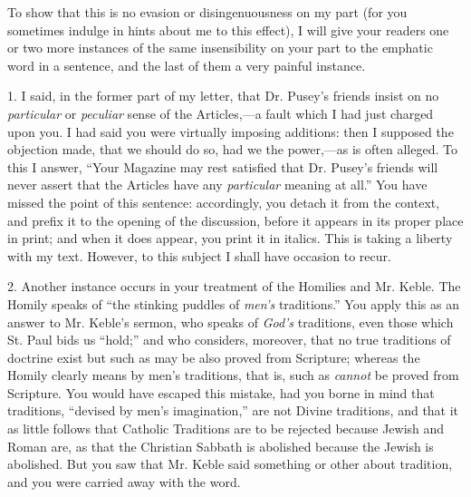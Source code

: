 To show that this is no evasion or
disingenuousness on my part (for you sometimes indulge in hints about
me to this effect), I will give your readers one or two more instances
of the same insensibility on your part to the emphatic word in a
sentence, and the last of them a very painful instance.

1. I said, in the former part of my letter, that
Dr. Pusey's friends insist on no \emph{particular} or \emph{peculiar}
sense of the Articles,—a fault which I had just charged upon you. I
had said you were virtually imposing additions: then I supposed the
objection made, that we should do so, had we the power,—as is often
alleged. To this I answer, ``Your Magazine may rest satisfied that Dr.
Pusey's friends will never assert that the Articles have any \emph{particular}
meaning at all.'' You have missed the point of this sentence:
accordingly, you detach it from the context, and prefix it to the
opening of the discussion, before it appears in its proper place in
print; and when it does appear, you print it in italics. This is
taking a liberty with my text. However, to this subject I shall have
occasion to recur.

2. Another instance occurs in your treatment of
the Homilies and Mr. Keble. The Homily speaks of ``the stinking puddles
of \emph{men's} traditions.'' You apply this as an answer to Mr. Keble's
sermon, who speaks of \emph{God's} traditions, even those which St.
Paul bids us ``hold;'' and who considers, moreover, that no true
traditions of doctrine exist but such as may be also proved from
Scripture; whereas the Homily clearly means by men's traditions, that
is, such as \emph{cannot} be proved from Scripture. You would have
escaped this mistake, had you borne in mind that traditions, ``devised
by men's imagination,'' are not Divine traditions, and that it as
little follows that Catholic Traditions are to be rejected because
Jewish and Roman are, as that the Christian Sabbath is abolished
because the Jewish is abolished. But you saw that Mr. Keble said
something or other about tradition, and you were carried away with the
word.

